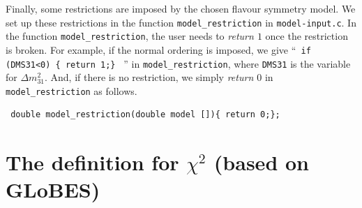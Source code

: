 \documentclass[aps,prd,nofootinbib,preprint]{revtex4}
\begin{document}
Finally, some restrictions are imposed by the chosen flavour symmetry model. We set up these restrictions in the function \texttt{model\_restriction} in \texttt{model-input.c}. In the function \texttt{model\_restriction}, the user needs to \textit{return $1$} once the restriction is broken. For example, if the normal ordering is imposed, we give ``\texttt{ if (DMS31<0) \{ return 1;\} } '' in \texttt{model\_restriction}, where \texttt{DMS31} is the variable for $\Delta m_{31}^2$. %
And, if there is no restriction, we simply \textit{return $0$} in \texttt{model\_restriction} as follows.
\begin{verbatim}
 double model_restriction(double model []){ return 0;};
\end{verbatim}


\section{The definition for $\chi^2$ (based on \textbf{GLoBES})}\label{sec:chi-squared}
 
\end{document}
